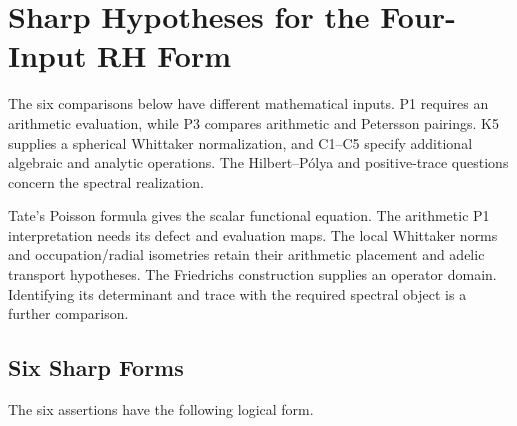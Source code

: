 \chapter{Sharp Hypotheses for the Four-Input RH Form}
\label{v4-arith:w3-comparison-B}

The six comparisons below have different mathematical inputs.
P1 requires an arithmetic evaluation, while P3 compares arithmetic
and Petersson pairings. K5 supplies a spherical Whittaker normalization,
and C1--C5 specify additional algebraic and analytic operations.
The Hilbert--P\'olya and positive-trace questions concern the spectral
realization.

Tate's Poisson formula gives the scalar functional equation.
The arithmetic P1 interpretation needs its defect and evaluation maps.
The local Whittaker norms and occupation/radial isometries retain their
arithmetic placement and adelic transport hypotheses. The Friedrichs
construction supplies an operator domain. Identifying its determinant
and trace with the required spectral object is a further comparison.

\section{Six Sharp Forms}
\label{v4-arith:w3-comparison-B:overextension-list}

The six assertions have the following logical form.

